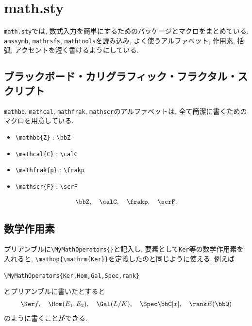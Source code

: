 \documentclass[../main.tex]{subfiles}
\begin{document}
\section{math.sty}

\texttt{math.sty}では, 数式入力を簡単にするためのパッケージとマクロをまとめている. 
\texttt{amssymb}, \texttt{mathrsfs}, \texttt{mathtools}を読み込み, よく使うアルファベット, 作用素, 括弧, アクセントを短く書けるようにしている. 

\subsection{ブラックボード・カリグラフィック・フラクタル・スクリプト}

\texttt{mathbb}, \texttt{mathcal}, \texttt{mathfrak}, \texttt{mathscr}のアルファベットは, 全て簡潔に書くためのマクロを用意している. 
\begin{itemize}
	\item \verb|\mathbb{Z}| : \verb|\bbZ|
	\item \verb|\mathcal{C}| : \verb|\calC|
	\item \verb|\mathfrak{p}| : \verb|\frakp|
	\item \verb|\mathscr{F}| : \verb|\scrF|
\end{itemize}

\begin{ex}{}{}
	\begin{align}
		\bbZ, \quad \calC, \quad \frakp, \quad \scrF.
	\end{align}
\end{ex}

\subsection{数学作用素}

プリアンブルに\verb|\MyMathOperators{}|と記入し, 要素として\texttt{Ker}等の数学作用素を入れると, \verb|\mathop{\mathrm{Ker}}|を定義したのと同じように使える. 
例えば
\begin{center}
	\verb|\MyMathOperators{Ker,Hom,Gal,Spec,rank}|
\end{center}
とプリアンブルに書いたとすると
\begin{align}
	\Ker f, \quad \Hom(E_1, E_2), \quad \Gal(L/K), \quad \Spec \bbC[x], \quad \rank E(\bbQ)
\end{align}
のように書くことができる.
\end{document}
